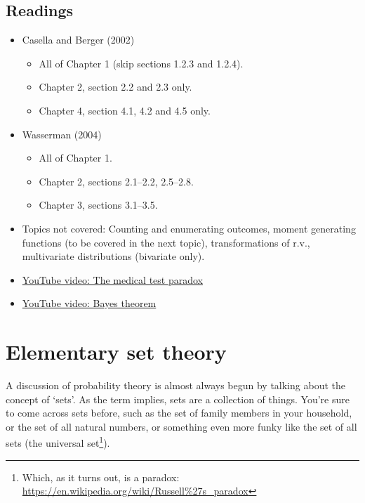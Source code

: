 \documentclass[
]{book}
\providecommand{\tightlist}{%
  \setlength{\itemsep}{0pt}\setlength{\parskip}{0pt}}
\theoremstyle{definition}
\theoremstyle{definition}
\theoremstyle{definition}
\theoremstyle{definition}
\theoremstyle{remark}
\begin{document}
\hypertarget{readings}{%
\subsection*{Readings}\label{readings}}

\begin{itemize}
\tightlist
\item
  Casella and Berger (2002)

  \begin{itemize}
  \tightlist
  \item
    All of Chapter 1 (skip sections 1.2.3 and 1.2.4).
  \item
    Chapter 2, section 2.2 and 2.3 only.
  \item
    Chapter 4, section 4.1, 4.2 and 4.5 only.
  \end{itemize}
\item
  Wasserman (2004)

  \begin{itemize}
  \tightlist
  \item
    All of Chapter 1.
  \item
    Chapter 2, sections 2.1--2.2, 2.5--2.8.
  \item
    Chapter 3, sections 3.1--3.5.
  \end{itemize}
\item
  Topics not covered: Counting and enumerating outcomes, moment generating functions (to be covered in the next topic), transformations of r.v., multivariate distributions (bivariate only).
\item
  \href{https://www.youtube.com/watch?v=lG4VkPoG3ko}{YouTube video: The medical test paradox}
\item
  \href{https://www.youtube.com/watch?v=HZGCoVF3YvM}{YouTube video: Bayes theorem}
\end{itemize}

\hypertarget{elementary-set-theory}{%
\section{Elementary set theory}\label{elementary-set-theory}}

A discussion of probability theory is almost always begun by talking about the concept of `sets'.
As the term implies, sets are a collection of things.
You're sure to come across sets before, such as the set of family members in your household, or the set of all natural numbers, or something even more funky like the set of all sets (the universal set\footnote{Which, as it turns out, is a paradox: \url{https://en.wikipedia.org/wiki/Russell\%27s_paradox}}).
\end{document}
